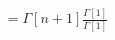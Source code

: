 \documentclass[preview]{standalone}
\begin{document}
\begin{align*}
= \Gamma[n+1] \frac{\Gamma[1]}{\Gamma[1]}
\end{align*}
\end{document}
